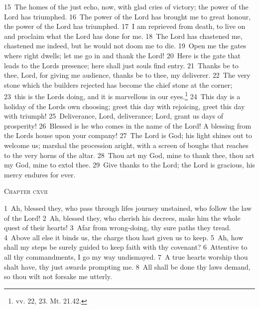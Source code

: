 \documentclass[10pt]{book} %
\begin{document}
\textcolor{benred8}{15}~The homes of the just echo, now, with glad cries of victory; the power of the Lord has triumphed. \textcolor{benred8}{16}~The power of the Lord has brought me to great honour, the power of the Lord has triumphed. \textcolor{benred8}{17}~I am reprieved from death, to live on and proclaim what the Lord has done for me. \textcolor{benred8}{18}~The Lord has chastened me, chastened me indeed, but he would not doom me to die. \textcolor{benred8}{19}~Open me the gates where right dwells; let me go in and thank the Lord! \textcolor{benred8}{20}~Here is the gate that leads to the Lord\textquotesingle s presence; here shall just souls find entry. \textcolor{benred8}{21}~Thanks be to thee, Lord, for giving me audience, thanks be to thee, my deliverer. \textcolor{benred8}{22}~The very stone which the builders rejected has become the chief stone at the corner; \textcolor{benred8}{23}~this is the Lord\textquotesingle s doing, and it is marvellous in our eyes.\footnote[1]{vv. 22, 23. Mt. 21.42.} \textcolor{benred8}{24}~This day is a holiday of the Lord\textquotesingle s own choosing; greet this day with rejoicing, greet this day with triumph!
\textcolor{benred8}{25}~Deliverance, Lord, deliverance; Lord, grant us days of prosperity! \textcolor{benred8}{26}~Blessed is he who comes in the name of the Lord! A blessing from the Lord\textquotesingle s house upon your company! \textcolor{benred8}{27}~The Lord is God; his light shines out to welcome us; marshal the procession aright, with a screen of boughs that reaches to the very horns of the altar. \textcolor{benred8}{28}~Thou art my God, mine to thank thee, thou art my God, mine to extol thee. \textcolor{benred8}{29}~Give thanks to the Lord; the Lord is gracious, his mercy endures for ever.
\begin{large}\begin{center}\textsc{Chapter cxvii}\end{center}\end{large}
\textcolor{benred8}{1}~Ah, blessed they, who pass through life\textquotesingle s journey unstained, who follow the law of the Lord! \textcolor{benred8}{2}~Ah, blessed they, who cherish his decrees, make him the whole quest of their hearts! \textcolor{benred8}{3}~Afar from wrong-doing, thy sure paths they tread. \textcolor{benred8}{4}~Above all else it binds us, the charge thou hast given us to keep. \textcolor{benred8}{5}~Ah, how shall my steps be surely guided to keep faith with thy covenant? \textcolor{benred8}{6}~Attentive to all thy commandments, I go my way undismayed. \textcolor{benred8}{7}~A true heart\textquotesingle s worship thou shalt have, thy just awards prompting me. \textcolor{benred8}{8}~All shall be done thy laws demand, so thou wilt not forsake me utterly.
\end{document}
